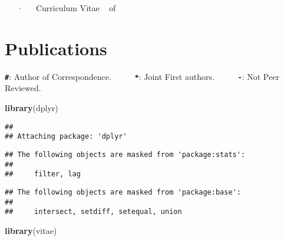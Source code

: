 \documentclass[11pt,a4paper,]{awesome-cv}
\newenvironment{Shaded}{\begin{snugshade}}{\end{snugshade}}
\newcommand{\FunctionTok}[1]{\textcolor[rgb]{0.13,0.29,0.53}{\textbf{#1}}}
\newcommand{\NormalTok}[1]{#1}
\begin{document}
\makecvheader

\makecvfooter
  {}
    {~~~·~~~Curriculum Vitae}
  {\thepage~ of \pageref{LastPage}~}





\section{Publications}\label{publications}

\textbf{\texttt{\#}}: Author of Correspondence.      
\textbf{\texttt{*}}: Joint First authors.       \textbf{\texttt{-}}: Not
Peer Reviewed.

\begin{Shaded}
\begin{Highlighting}[]
\FunctionTok{library}\NormalTok{(dplyr)}
\end{Highlighting}
\end{Shaded}

\begin{verbatim}
## 
## Attaching package: 'dplyr'
\end{verbatim}

\begin{verbatim}
## The following objects are masked from 'package:stats':
## 
##     filter, lag
\end{verbatim}

\begin{verbatim}
## The following objects are masked from 'package:base':
## 
##     intersect, setdiff, setequal, union
\end{verbatim}

\begin{Shaded}
\begin{Highlighting}[]
\FunctionTok{library}\NormalTok{(vitae)}
\end{Highlighting}
\end{Shaded}
\end{document}
